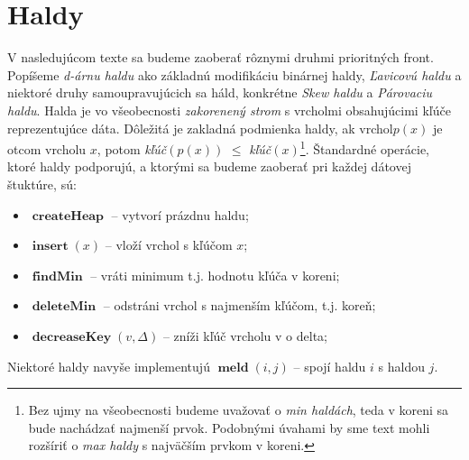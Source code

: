 \section{Haldy}

V nasledujúcom texte sa budeme zaoberať rôznymi druhmi prioritných front. Popíšeme \emph{d-árnu haldu} ako 
základnú modifikáciu binárnej haldy, \emph{Ľavicovú haldu} a niektoré druhy samoupravujúcich sa háld, konkrétne 
\emph{Skew haldu} a \emph{Párovaciu haldu}.
Halda je vo všeobecnosti \emph{zakorenený strom} s vrcholmi obsahujúcimi kľúče reprezentujúce dáta. Dôležitá je 
zakladná podmienka haldy, ak vrchol$p(x)$ je otcom vrcholu $x$, potom \emph{kľúč}$(p(x))$ $\leq$ \emph{kľúč}$(x)$\footnote{Bez ujmy na všeobecnosti budeme uvažovať o \emph{min haldách}, teda v koreni sa bude nachádzať najmenší prvok. Podobnými úvahami by sme text mohli rozšíriť o \emph{max haldy} s najväčším prvkom v koreni.}.
Štandardné operácie, ktoré haldy podporujú, a ktorými sa budeme zaoberať pri každej dátovej štuktúre, sú:
\begin{itemize}
\item $\mathop{\mathbf{createHeap}}$ -- vytvorí prázdnu haldu;
\item $\mathop{\mathbf{insert}}\left( x\right)$ -- vloží vrchol s kľúčom $x$;
\item $\mathop{\mathbf{findMin}}$ -- vráti minimum t.j. hodnotu kľúča v koreni;
\item $\mathop{\mathbf{deleteMin}}$ -- odstráni vrchol s najmenším kľúčom, t.j. koreň;
\item $\mathop{\mathbf{decreaseKey}}\left( v, \Delta\right)$ -- zníži kľúč vrcholu v o delta;
\end{itemize}
Niektoré haldy navyše implementujú $\mathop{\mathbf{meld}}\left( i, j\right)$ -- spojí haldu $i$ s haldou $j$.





